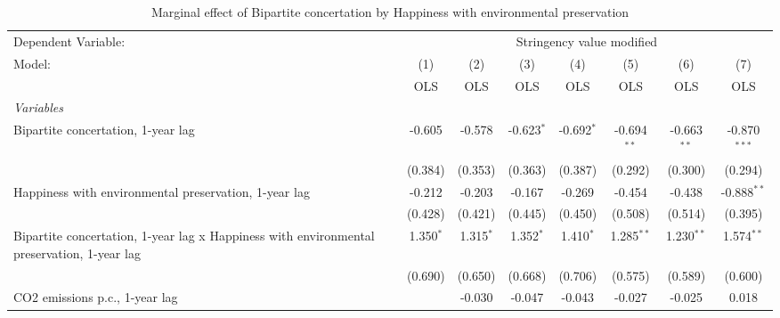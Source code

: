 
\begin{table}[htbp]
   \caption{Marginal effect of Bipartite concertation by Happiness with environmental preservation}
   \centering
   \begin{tabular}{lccccccc}
      \toprule
      Dependent Variable: & \multicolumn{7}{c}{Stringency value modified}\\
      Model:                                                                                     & (1)         & (2)         & (3)           & (4)           & (5)           & (6)           & (7)\\  
                                                                                                 &  OLS        & OLS         & OLS           & OLS           & OLS           & OLS           & OLS\\  
      \midrule
      \emph{Variables}\\
      Bipartite concertation, 1-year lag                                                         & -0.605      & -0.578      & -0.623$^{*}$  & -0.692$^{*}$  & -0.694$^{**}$ & -0.663$^{**}$ & -0.870$^{***}$\\   
                                                                                                 & (0.384)     & (0.353)     & (0.363)       & (0.387)       & (0.292)       & (0.300)       & (0.294)\\   
      Happiness with environmental preservation, 1-year lag                                      & -0.212      & -0.203      & -0.167        & -0.269        & -0.454        & -0.438        & -0.888$^{**}$\\   
                                                                                                 & (0.428)     & (0.421)     & (0.445)       & (0.450)       & (0.508)       & (0.514)       & (0.395)\\   
      Bipartite concertation, 1-year lag x Happiness with environmental preservation, 1-year lag & 1.350$^{*}$ & 1.315$^{*}$ & 1.352$^{*}$   & 1.410$^{*}$   & 1.285$^{**}$  & 1.230$^{**}$  & 1.574$^{**}$\\   
                                                                                                 & (0.690)     & (0.650)     & (0.668)       & (0.706)       & (0.575)       & (0.589)       & (0.600)\\   
      CO2 emissions p.c., 1-year lag                                                             &             & -0.030      & -0.047        & -0.043        & -0.027        & -0.025        & 0.018\\   

\end{tabular}
\end{table}
